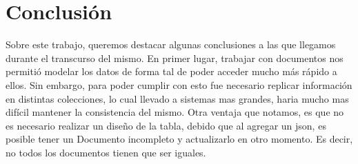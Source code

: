 \section{Conclusión}

Sobre este trabajo, queremos destacar algunas conclusiones a las que 
llegamos durante el transcurso del mismo. En primer lugar, trabajar con 
documentos nos permitió modelar los datos de forma tal de poder acceder 
mucho más rápido a ellos. Sin embargo, para poder cumplir con esto fue necesario
replicar información en distintas colecciones, lo cual llevado a sistemas
mas grandes, haria mucho mas difícil mantener la consistencia del mismo.
Otra ventaja que notamos, es que no es necesario realizar un diseño de la tabla, debido que 
al agregar un json, es posible tener un Documento incompleto y actualizarlo
en otro momento. Es decir, no todos los documentos tienen que ser iguales.
